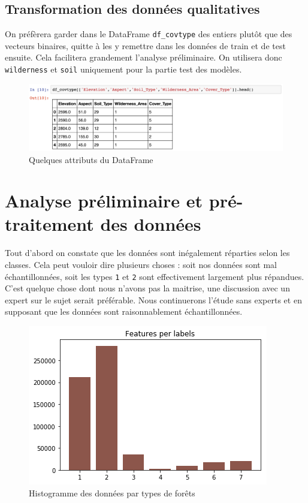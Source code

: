 \documentclass[12pt,a4paper]{article}
\numberwithin{equation}{section}
\begin{document}
	
	\subsection{Transformation des données qualitatives}
	On préfèrera garder dans le DataFrame \verb!df_covtype! des entiers plutôt que des vecteurs binaires, quitte à les y remettre dans les données de train et de test ensuite. Cela facilitera grandement l'analyse préliminaire. On utilisera donc \verb!wilderness! et \verb!soil! uniquement pour la partie test des modèles.
	
	\begin{figure}[h]
		\centering
		\includegraphics[width=1\linewidth]{"./img/Dataframe"}
		\caption{Quelques attributs du DataFrame}
		\label{fig:dataframe}
	\end{figure}


	\section{Analyse préliminaire et pré-traitement des données}
	
	Tout d'abord on constate que les données sont inégalement réparties selon les classes. Cela peut vouloir dire plusieurs choses : soit nos données sont mal échantillonnées, soit les types \verb!1! et \verb!2! sont effectivement largement plus répandues. C'est quelque chose dont nous n'avons pas la maitrise, une discussion avec un expert sur le sujet serait préférable. Nous continuerons l'étude sans experts et en supposant que les données sont raisonnablement échantillonnées.
	
	\begin{figure}[h]
		\centering
		\includegraphics[width=0.7\linewidth]{img/data_hist}
		\caption{Histogramme des données par types de forêts}
		\label{fig:datahist}
	\end{figure}
	
\end{document}
